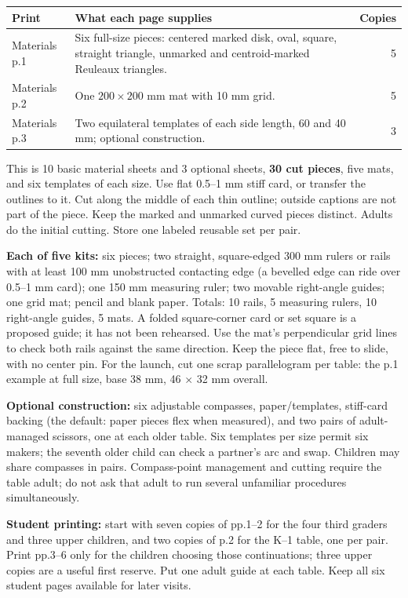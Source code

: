 \documentclass[11pt,letterpaper]{article}
\newcommand{\lead}[1]{\textbf{#1}}
\begin{document}
\begin{center}
\begin{tabular}{p{28mm}p{112mm}r}
\toprule Print & What each page supplies & Copies\\\midrule
Materials p.1 & Six full-size pieces: centered marked disk, oval, square, straight triangle, unmarked and centroid-marked Reuleaux triangles. & 5\\
Materials p.2 & One $200\times200$ mm mat with 10 mm grid. & 5\\
Materials p.3 & Two equilateral templates of each side length, 60 and 40 mm; optional construction. & 3\\\bottomrule
\end{tabular}
\end{center}
This is 10 basic material sheets and 3 optional sheets, \textbf{30 cut pieces}, five mats, and six templates of each size. Use flat 0.5--1 mm stiff card, or transfer the outlines to it. Cut along the middle of each thin outline; outside captions are not part of the piece. Keep the marked and unmarked curved pieces distinct. Adults do the initial cutting. Store one labeled reusable set per pair.

\lead{Each of five kits:} six pieces; two straight, square-edged 300 mm rulers or rails with at least 100 mm unobstructed contacting edge (a bevelled edge can ride over 0.5--1 mm card); one 150 mm measuring ruler; two movable right-angle guides; one grid mat; pencil and blank paper. Totals: 10 rails, 5 measuring rulers, 10 right-angle guides, 5 mats. A folded square-corner card or set square is a proposed guide; it has not been rehearsed. Use the mat's perpendicular grid lines to check both rails against the same direction. Keep the piece flat, free to slide, with no center pin. For the launch, cut one scrap parallelogram per table: the p.1 example at full size, base 38 mm, 46 $\times$ 32 mm overall.

\lead{Optional construction:} six adjustable compasses, paper/templates, stiff-card backing (the default: paper pieces flex when measured), and two pairs of adult-managed scissors, one at each older table. Six templates per size permit six makers; the seventh older child can check a partner's arc and swap. Children may share compasses in pairs. Compass-point management and cutting require the table adult; do not ask that adult to run several unfamiliar procedures simultaneously.

\lead{Student printing:} start with seven copies of pp.1--2 for the four third graders and three upper children, and two copies of p.2 for the K--1 table, one per pair. Print pp.3--6 only for the children choosing those continuations; three upper copies are a useful first reserve. Put one adult guide at each table. Keep all six student pages available for later visits.
\end{document}
